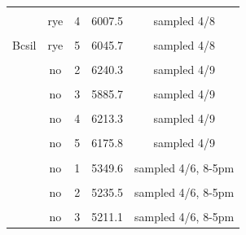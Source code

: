 \documentclass[
]{article}
\begin{document}
\begin{table}[H]
\begin{tabular}[t]{ccccc}
\cellcolor{gray!6}{Bcsil} & \cellcolor{gray!6}{no} & \cellcolor{gray!6}{4} & \cellcolor{gray!6}{6240.2} & \cellcolor{gray!6}{sampled 4/8}\\
 & rye & 4 & 6007.5 & sampled 4/8\\

\cellcolor{gray!6}{Bcsil} & \cellcolor{gray!6}{no} & \cellcolor{gray!6}{5} & \cellcolor{gray!6}{6682.9} & \cellcolor{gray!6}{sampled 4/8}\\
\multirow[t]{-10}{*}{\centering\arraybackslash Bcsil} & rye & 5 & 6045.7 & sampled 4/8\\
\cmidrule{1-5}
\cellcolor{gray!6}{BS} & \cellcolor{gray!6}{rye} & \cellcolor{gray!6}{1} & \cellcolor{gray!6}{6068.7} & \cellcolor{gray!6}{sampled 4/9}\\
 & no & 2 & 6240.3 & sampled 4/9\\

\cellcolor{gray!6}{BS} & \cellcolor{gray!6}{rye} & \cellcolor{gray!6}{2} & \cellcolor{gray!6}{5950.5} & \cellcolor{gray!6}{sampled 4/9}\\
 & no & 3 & 5885.7 & sampled 4/9\\

\cellcolor{gray!6}{BS} & \cellcolor{gray!6}{rye} & \cellcolor{gray!6}{3} & \cellcolor{gray!6}{5734.1} & \cellcolor{gray!6}{sampled 4/9}\\
 & no & 4 & 6213.3 & sampled 4/9\\

\cellcolor{gray!6}{BS} & \cellcolor{gray!6}{rye} & \cellcolor{gray!6}{4} & \cellcolor{gray!6}{5968.2} & \cellcolor{gray!6}{sampled 4/9}\\
 & no & 5 & 6175.8 & sampled 4/9\\

\cellcolor{gray!6}{BS} & \cellcolor{gray!6}{rye} & \cellcolor{gray!6}{5} & \cellcolor{gray!6}{6050.4} & \cellcolor{gray!6}{sampled 4/9}\\
 & no & 1 & 5349.6 & sampled 4/6, 8-5pm\\

\cellcolor{gray!6}{East} & \cellcolor{gray!6}{rye} & \cellcolor{gray!6}{1} & \cellcolor{gray!6}{5460.6} & \cellcolor{gray!6}{sampled 4/6, 8-5pm}\\
 & no & 2 & 5235.5 & sampled 4/6, 8-5pm\\

\cellcolor{gray!6}{East} & \cellcolor{gray!6}{rye} & \cellcolor{gray!6}{2} & \cellcolor{gray!6}{5055.2} & \cellcolor{gray!6}{sampled 4/6, 8-5pm}\\
 & no & 3 & 5211.1 & sampled 4/6, 8-5pm\\


\end{tabular}
\end{table}
\end{document}
